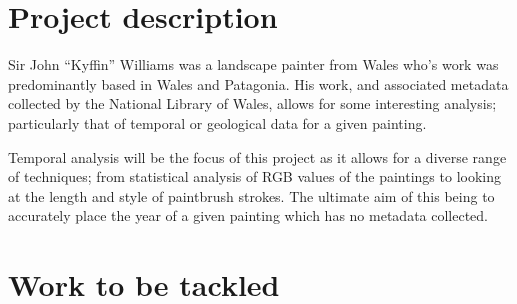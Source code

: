 \documentclass[11pt,fleqn,twoside]{article}
\begin{document}

\mmp

\setcounter{tocdepth}{3} %


\section{Project description}
Sir John ``Kyffin'' Williams was a landscape painter from Wales who's work was predominantly based in Wales and Patagonia. His work, and associated metadata collected by the National Library of Wales, allows for some interesting analysis; particularly that of temporal or geological %
data for a given painting.

Temporal analysis will be the focus of this project as it allows for a diverse range of techniques; from statistical analysis of RGB values of the paintings to looking at the length and style of paintbrush strokes. The ultimate aim of this being to accurately place the year of a given painting which has no metadata collected.

\section{Work to be tackled}
\end{document}

